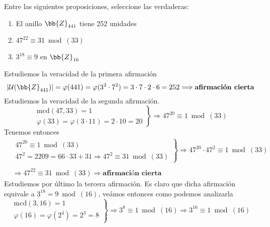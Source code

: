 \documentclass[12pt]{article}
\begin{document}
    \begin{ejercicio}[1 punto]
        Entre las siguientes proposiciones, seleccione las verdaderas:
        \begin{enumerate}[label=$\blacksquare$]
            \item El anillo $\bb{Z}_{441}$ tiene 252 unidades
            \item $47^{22}\equiv 31 \bmod{(33)}$
            \item $3^{18}\equiv 9$ en $\bb{Z}_{16}$
        \end{enumerate}
        Estudiemos la veracidad de la primera afirmación
        \begin{equation*}
            |\mathcal{U}(\bb{Z}_{441})|=\varphi(441)=\varphi(3^2\cdot 7^2)=3\cdot7\cdot2\cdot6=252\Longrightarrow \textbf{afirmación cierta}
        \end{equation*}
        Estudiemos la veracidad de la segunda afirmación.
        \begin{equation*}
            \left.\begin{array}{c}
                \text{mcd}{(47,33)}=1 \\
                \varphi(33)=\varphi(3\cdot11)=2\cdot10=20
            \end{array} \right\} \Longrightarrow 47^{20}\equiv1\bmod{(33)}
        \end{equation*}
        Tenemos entonces 
        \begin{align*}
            &\left. \begin{array}{c}
                47^{20}\equiv1\bmod{(33)} \\
                47^2=2209=66\cdot33+31\Longrightarrow 47^2\equiv31\bmod{(33)}
            \end{array} \right\} \Longrightarrow 47^{20}\cdot 47^2\equiv1\bmod{(33)} \\ \\
            &\Longrightarrow 47^{22}\equiv31\bmod{(33)}\Longrightarrow \textbf{afirmación cierta}
        \end{align*}
        Estudiemos por último la tercera afirmación. Es claro que dicha afirmación equivale a $3^{18}=9\bmod{(16)}$, veámos entonces como podemos analizarla
        \begin{equation*}
            \left.\begin{array}{c}
                \text{mcd}{(3,16)}=1 \\
                \varphi(16)=\varphi(2^4)=2^3=8
            \end{array} \right\} \Longrightarrow 3^8\equiv1\bmod{(16)} \Longrightarrow 3^{16}\equiv1\bmod{(16)}

\end{equation*}
\end{ejercicio}
\end{document}
